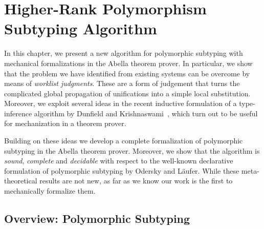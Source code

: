 \chapter{Higher-Rank Polymorphism Subtyping Algorithm}
\label{chap:ITP}

In this chapter, we present a new algorithm for polymorphic subtyping
with mechanical formalizations in the Abella theorem prover.
%
In particular, we show that the problem we have identified from existing systems
can be overcome by means of \emph{worklist judgments}.
These are a form of judgement that turns the complicated
global propagation of unifications into a simple local substitution.
Moreover, we exploit several ideas in the recent inductive
formulation of a type-inference algorithm by
Dunfield and Krishnaswami~\cite{dunfield2013complete}, which turn out to be useful
for mechanization in a theorem prover.

Building on these ideas we develop a complete formalization of
polymorphic subtyping in the Abella theorem prover. Moreover, we
 show that the algorithm is \emph{sound}, \emph{complete} and \emph{decidable} with
respect to the well-known declarative formulation of polymorphic subtyping by
Odersky and L\"aufer.  While these meta-theoretical results are not new, as far
as we know our work is the first to mechanically formalize them.


\section{Overview: Polymorphic Subtyping}










